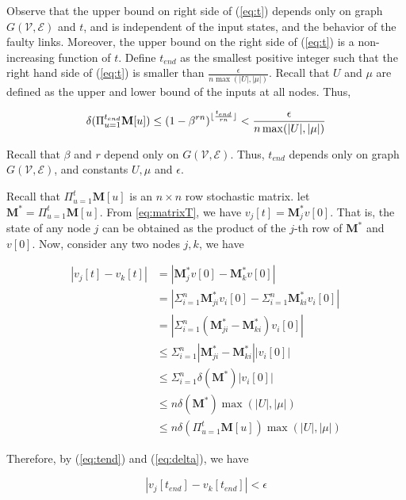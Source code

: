\documentclass{llncs}
\newcommand{\scripte}{\mathcal{E}}
\newcommand{\scriptv}{\mathcal{V}}
\newcommand{\bfM}{{\bf M}}
\newcommand{\bfv}{v}
\newcommand{\matrixm}{\textbf{M}}
\begin{document}
Observe that the upper bound on right side of (\ref{eq:t}) depends only on graph $G(\scriptv, \scripte)$ and $t$, and is
independent of the input states, and the behavior of the faulty links. Moreover, the
upper bound on the right side of (\ref{eq:t}) is a non-increasing function of $t$. Define $t_{end}$ as the smallest positive integer such that the right hand side of (\ref{eq:t}) is smaller than $\frac{\epsilon}{n \max(|U|, |\mu|)}$. Recall that $U$ and $\mu$ are defined as the upper and lower bound of the inputs at all nodes. Thus,

\begin{equation}
\label{eq:tend}
\delta(\Pi_{u=1}^{t_{end}} \bfM[u]) \leq \left( 1-\beta^{rn}\right)^{\lfloor\frac{t_{end}}{r n}\rfloor} <
\frac{\epsilon}{n \max(|U|, |\mu|)}
\end{equation}

Recall that $\beta$ and $r$ depend only on $G(\scriptv, \scripte)$. Thus, $t_{end}$ depends only on graph $G(\scriptv, \scripte)$, and constants $U, \mu$ and $\epsilon$.

Recall that $\Pi_{u=1}^t \matrixm[u]$ is an $n \times n$ row stochastic matrix. let $\matrixm^* = \Pi_{u=1}^t \matrixm[u]$. From \ref{eq:matrixT}, we have $v_j[t] = \matrixm^*_j v[0]$. That is, the state of any node $j$ can be obtained as the product of the $j$-th row of $\matrixm^*$ and $v[0]$. Now, consider any two nodes $j, k$, we have

\begin{align}
|\bfv_j[t] - v_k[t]| &= |\matrixm^*_j v[0] - \matrixm^*_k v[0]| \nonumber\\
&= |\Sigma_{i=1}^n \matrixm^*_{ji} v_i[0] - \Sigma_{i=1}^n \matrixm^*_{ki} v_i[0]| \nonumber\\
&= |\Sigma_{i=1}^n \left(\matrixm^*_{ji} - \matrixm^*_{ki} \right) v_i[0]| \nonumber\\
&\leq \Sigma_{i=1}^n | \matrixm^*_{ji} - \matrixm^*_{ki} | |v_i[0]| \nonumber\\
&\leq \Sigma_{i=1}^n \delta(\matrixm^*) |v_i[0]| \nonumber\\
&\leq n \delta(\matrixm^*) \max(|U|, |\mu|) \nonumber\\
&\leq n \delta(\Pi_{u=1}^t \matrixm[u]) \max(|U|, |\mu|) \label{eq:delta}
\end{align}



Therefore, by (\ref{eq:tend}) and (\ref{eq:delta}), we have

\begin{equation}
\label{eq:final}
|v_j[t_{end}] - v_k[t_{end}]| < \epsilon
\end{equation}
\end{document}
